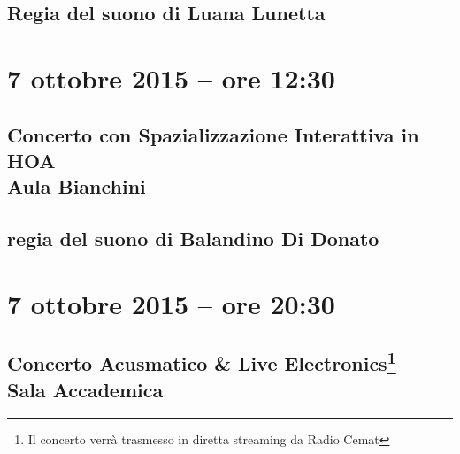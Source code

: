 \documentclass[8pt, twoside, a5paper]{extreport}
\begin{document}
\subsection*{\textsf{Regia del suono di Luana Lunetta}}

\bigskip

\begin{multicols}{2}

%


\end{multicols}

\clearpage


\section*{7 ottobre 2015 -- ore 12:30}

\subsection*{{\small Concerto con Spazializzazione Interattiva in HOA} \\
	\textsf{Aula Bianchini}}

{\fontsize{30}{30} }

\subsection*{\textsf{regia del suono di Balandino Di Donato}}

\bigskip

\begin{multicols}{2}

%


\end{multicols}

\clearpage

\section*{7 ottobre 2015 -- ore 20:30}

\subsection*{{\small Concerto Acusmatico \& Live Electronics\footnote{ Il concerto verrà trasmesso in diretta streaming da Radio Cemat}} \\
	\textsf{Sala Accademica}}
\end{document}
